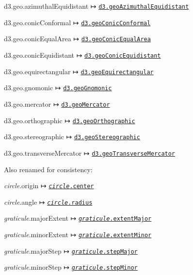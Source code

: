 \begin{DoxyItemize}
\item d3.\+geo.\+azimuthal\+Equidistant ↦ \href{https://github.com/d3/d3-geo/blob/master/README.md#geoAzimuthalEquidistant}{\tt d3.\+geo\+Azimuthal\+Equidistant}
\item d3.\+geo.\+conic\+Conformal ↦ \href{https://github.com/d3/d3-geo/blob/master/README.md#geoConicConformal}{\tt d3.\+geo\+Conic\+Conformal}
\item d3.\+geo.\+conic\+Equal\+Area ↦ \href{https://github.com/d3/d3-geo/blob/master/README.md#geoConicEqualArea}{\tt d3.\+geo\+Conic\+Equal\+Area}
\item d3.\+geo.\+conic\+Equidistant ↦ \href{https://github.com/d3/d3-geo/blob/master/README.md#geoConicEquidistant}{\tt d3.\+geo\+Conic\+Equidistant}
\item d3.\+geo.\+equirectangular ↦ \href{https://github.com/d3/d3-geo/blob/master/README.md#geoEquirectangular}{\tt d3.\+geo\+Equirectangular}
\item d3.\+geo.\+gnomonic ↦ \href{https://github.com/d3/d3-geo/blob/master/README.md#geoGnomonic}{\tt d3.\+geo\+Gnomonic}
\item d3.\+geo.\+mercator ↦ \href{https://github.com/d3/d3-geo/blob/master/README.md#geoMercator}{\tt d3.\+geo\+Mercator}
\item d3.\+geo.\+orthographic ↦ \href{https://github.com/d3/d3-geo/blob/master/README.md#geoOrthographic}{\tt d3.\+geo\+Orthographic}
\item d3.\+geo.\+stereographic ↦ \href{https://github.com/d3/d3-geo/blob/master/README.md#geoStereographic}{\tt d3.\+geo\+Stereographic}
\item d3.\+geo.\+transverse\+Mercator ↦ \href{https://github.com/d3/d3-geo/blob/master/README.md#geoTransverseMercator}{\tt d3.\+geo\+Transverse\+Mercator}
\end{DoxyItemize}

Also renamed for consistency\+:


\begin{DoxyItemize}
\item {\itshape circle}.origin ↦ \href{https://github.com/d3/d3-geo/blob/master/README.md#circle_center}{\tt {\itshape circle}.center}
\item {\itshape circle}.angle ↦ \href{https://github.com/d3/d3-geo/blob/master/README.md#circle_radius}{\tt {\itshape circle}.radius}
\item {\itshape graticule}.major\+Extent ↦ \href{https://github.com/d3/d3-geo/blob/master/README.md#graticule_extentMajor}{\tt {\itshape graticule}.extent\+Major}
\item {\itshape graticule}.minor\+Extent ↦ \href{https://github.com/d3/d3-geo/blob/master/README.md#graticule_extentMinor}{\tt {\itshape graticule}.extent\+Minor}
\item {\itshape graticule}.major\+Step ↦ \href{https://github.com/d3/d3-geo/blob/master/README.md#graticule_stepMajor}{\tt {\itshape graticule}.step\+Major}
\item {\itshape graticule}.minor\+Step ↦ \href{https://github.com/d3/d3-geo/blob/master/README.md#graticule_stepMinor}{\tt {\itshape graticule}.step\+Minor}
\end{DoxyItemize}

